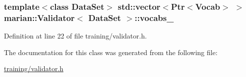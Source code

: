 \subsubsection[{\texorpdfstring{vocabs\+\_\+}{vocabs_}}]{\setlength{\rightskip}{0pt plus 5cm}template$<$class Data\+Set$>$ std\+::vector$<${\bf Ptr}$<${\bf Vocab}$>$ $>$ {\bf marian\+::\+Validator}$<$ Data\+Set $>$\+::vocabs\+\_\+\hspace{0.3cm}{\ttfamily [protected]}}\hypertarget{classmarian_1_1Validator_ae6afb9838529db124fcc1aa8f0cb1fc9}{}\label{classmarian_1_1Validator_ae6afb9838529db124fcc1aa8f0cb1fc9}


Definition at line 22 of file training/validator.\+h.



The documentation for this class was generated from the following file\+:\begin{DoxyCompactItemize}
\item 
\hyperlink{training_2validator_8h}{training/validator.\+h}\end{DoxyCompactItemize}
